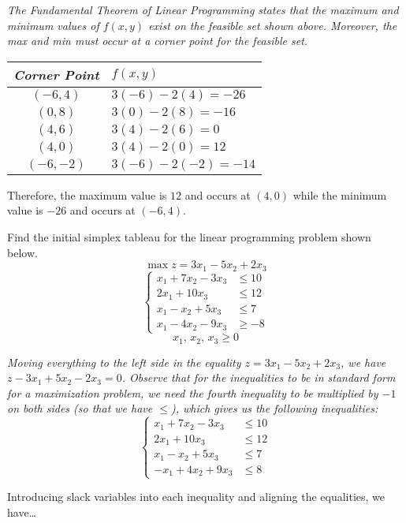 \documentclass[12pt,letterpaper]{exam}
\begin{document}
\begin{questions}
\begin{parts}
{\itshape The Fundamental Theorem of Linear Programming states that the maximum and minimum values of $f(x, y)$ exist on the feasible set shown above. Moreover, the max and min must occur at a corner point for the feasible set. 
	\begin{table}[!ht]
	\centering
	\begin{tabular}{c | l}
	\textit{Corner Point} & $f(x, y)$ \\ \hline
	$(-6, 4)$ & $3(-6) - 2(4)= -26$ \\
	$(0, 8)$ & $3(0) - 2(8)= -16$ \\
	$(4, 6)$ & $3(4) - 2(6)= 0$ \\
	$(4, 0)$ & $3(4) - 2(0)= 12$ \\
	$(-6, -2)$ & $3(-6) - 2(-2)= -14$
	\end{tabular}
	\end{table} \par
Therefore, the maximum value is $12$ and occurs at $(4, 0)$ while the minimum value is $-26$ and occurs at $(-6, 4)$. 
}
\end{parts}



\newpage
\question[10] Find the initial simplex tableau for the linear programming problem shown below.
	\[
	\max z= 3x_1 - 5x_2 + 2x_3
	\]
	\[
	\left\{
	\begin{aligned}
	x_1 + 7x_2 - 3x_3 &\leq 10 \\
	2x_1 + 10x_3 &\leq 12 \\
	x_1 - x_2 + 5x_3 &\leq 7 \\
	x_1 - 4x_2 - 9x_3 &\geq -8
	\end{aligned} \right.
	\]
	\[
	x_1,\, x_2,\, x_3 \geq 0
	\] \pspace

{\itshape Moving everything to the left side in the equality $z= 3x_1 - 5x_2 + 2x_3$, we have $z - 3x_1 + 5x_2 - 2x_3= 0$. Observe that for the inequalities to be in standard form for a maximization problem, we need the fourth inequality to be multiplied by $-1$ on both sides (so that we have $\leq$), which gives us the following inequalities: 
	\[
	\left\{
	\begin{aligned}
	x_1 + 7x_2 - 3x_3 &\leq 10 \\
	2x_1 + 10x_3 &\leq 12 \\
	x_1 - x_2 + 5x_3 &\leq 7 \\
	-x_1 + 4x_2 + 9x_3 &\leq 8
	\end{aligned} \right.
	\] 

Introducing slack variables into each inequality and aligning the equalities, we have\dots \pspace

}
\end{questions}
\end{document}
